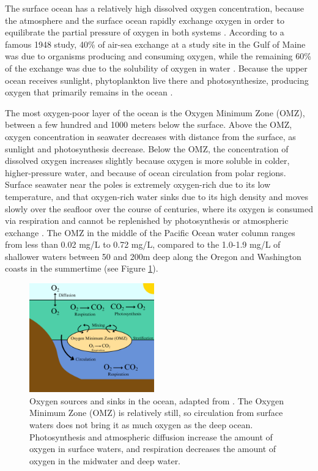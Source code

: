 \documentclass[12pt,twoside]{reedthesis}
\begin{document}
The surface ocean has a relatively high dissolved oxygen concentration, because the atmosphere and the surface ocean rapidly exchange oxygen in order to equilibrate the partial pressure of oxygen in both systems \autocite{Ito2010}. According to a famous 1948 study, 40\% of air-sea exchange at a study site in the Gulf of Maine was due to organisms producing and consuming oxygen, while the remaining 60\% of the exchange was due to the solubility of oxygen in water \autocite{Redfield1948}. Because the upper ocean receives sunlight, phytoplankton live there and photosynthesize, producing oxygen that primarily remains in the ocean \autocite{Li2020}. 

The most oxygen-poor layer of the ocean is the Oxygen Minimum Zone (OMZ), between a few hundred and 1000 meters below the surface. Above the OMZ, oxygen concentration in seawater decreases with distance from the surface, as sunlight and photosynthesis decrease. Below the OMZ, the concentration of dissolved oxygen increases slightly because oxygen is more soluble in colder, higher-pressure water, and because of ocean circulation from polar regions. Surface seawater near the poles is extremely oxygen-rich due to its low temperature, and that oxygen-rich water sinks due to its high density and moves slowly over the seafloor over the course of centuries, where its oxygen is consumed via respiration and cannot be replenished by photosynthesis or atmospheric exchange \autocite{Karstensen2008, Deutsch2024, Ito2010}. The OMZ in the middle of the Pacific Ocean water column ranges from less than 0.02 mg/L to 0.72 mg/L, compared to the 1.0-1.9 mg/L of shallower waters between 50 and 200m deep along the Oregon and Washington coasts in the summertime \autocite{Karstensen2008, Deutsch2024, Barth2024, Pierce2012, Wyrtki1962} (see Figure \ref{OMZ}).

\begin{figure}
	\begin{center}
		\includegraphics[width=0.48\textwidth]{Fig_OMZ}
		\caption[Oxygen circulation]{\footnotesize{Oxygen sources and sinks in the ocean, adapted from \autocite{Deutsch2024}. The Oxygen Minimum Zone (OMZ) is relatively still, so circulation from surface waters does not bring it as much oxygen as the deep ocean. Photosynthesis and atmospheric diffusion increase the amount of oxygen in surface waters, and respiration decreases the amount of oxygen in the midwater and deep water.}}
		\label{OMZ}
	\end{center}
\end{figure} 
\end{document}
